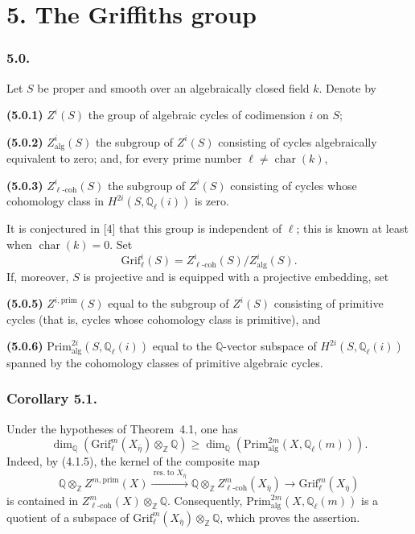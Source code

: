 \section*{5. The Griffiths group}

\subsubsection*{5.0.}
Let $S$ be proper and smooth over an algebraically closed field $k$.
Denote by

\medskip
\noindent\textbf{(5.0.1)} $Z^i(S)$ the group of algebraic cycles of
codimension $i$ on $S$;

\noindent\textbf{(5.0.2)} $Z^i_{\mathrm{alg}}(S)$ the subgroup of
$Z^i(S)$ consisting of cycles algebraically equivalent to zero; and, for
every prime number $\ell\ne\operatorname{char}(k)$,

\noindent\textbf{(5.0.3)} $Z^i_{\ell\text{-}\mathrm{coh}}(S)$ the subgroup
of $Z^i(S)$ consisting of cycles whose cohomology class in
$H^{2i}(S,\mathbb Q_\ell(i))$ is zero.

It is conjectured in \textup{[4]} that this group is independent of $\ell$;
this is known at least when $\operatorname{char}(k)=0$.  Set
\begin{equation}\tag{5.0.4}
\mathrm{Grif}^i_\ell(S)
 =Z^i_{\ell\text{-}\mathrm{coh}}(S)/Z^i_{\mathrm{alg}}(S).
\end{equation}
If, moreover, $S$ is projective and is equipped with a projective embedding,
set

\medskip
\noindent\textbf{(5.0.5)} $Z^{i,\mathrm{prim}}(S)$ equal to the subgroup
of $Z^i(S)$ consisting of primitive cycles (that is, cycles whose
cohomology class is primitive), and

\noindent\textbf{(5.0.6)}
$\mathrm{Prim}^{2i}_{\mathrm{alg}}(S,\mathbb Q_\ell(i))$ equal to the
$\mathbb Q$-vector subspace of $H^{2i}(S,\mathbb Q_\ell(i))$ spanned by
the cohomology classes of primitive algebraic cycles.

\subsubsection*{Corollary 5.1.}
Under the hypotheses of Theorem~4.1, one has
\begin{equation}\tag{5.1.1}
\dim_{\mathbb Q}\!\left(
  \mathrm{Grif}^m_\ell(X_{\bar\eta})\otimes_{\mathbb Z}\mathbb Q
\right)
\geq
\dim_{\mathbb Q}\!\left(
  \mathrm{Prim}^{2m}_{\mathrm{alg}}(X,\mathbb Q_\ell(m))
\right).
\end{equation}
Indeed, by (4.1.5), the kernel of the composite map
\begin{equation*}
\mathbb Q\otimes_{\mathbb Z}Z^{m,\mathrm{prim}}(X)
 \xrightarrow{\ \mathrm{res.}\ \text{to }X_{\bar\eta}\ }
\mathbb Q\otimes_{\mathbb Z}Z^m_{\ell\text{-}\mathrm{coh}}
  (X_{\bar\eta})
 \longrightarrow \mathrm{Grif}^m_\ell(X_{\bar\eta})
\end{equation*}
is contained in
  $Z^m_{\ell\text{-}\mathrm{coh}}(X)\otimes_{\mathbb Z}\mathbb Q$.
Consequently,
  $\mathrm{Prim}^{2m}_{\mathrm{alg}}(X,\mathbb Q_\ell(m))$ is a quotient
of a subspace of
  $\mathrm{Grif}^m_\ell(X_{\bar\eta})\otimes_{\mathbb Z}\mathbb Q$,
which proves the assertion.

